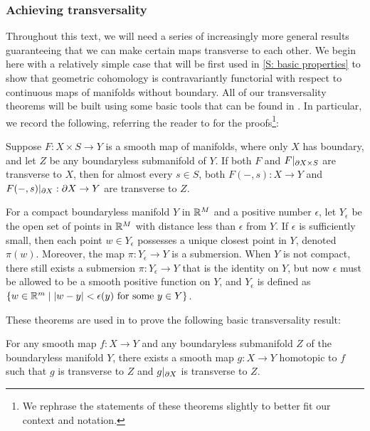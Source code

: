 \subsubsection{Achieving transversality}


Throughout this text, we will need a series of increasingly more general results guaranteeing that we can make certain maps transverse to each other.  We begin here with a relatively simple case that will be first used in  \cref{S: basic properties} to show that geometric cohomology is contravariantly functorial with respect to continuous maps of manifolds without boundary.
All of our transversality theorems  will be built using some basic tools that can be found in \cite[Section 2.3]{GuPo74}. In particular, we record the following, referring the reader to \cite[Section 2.3]{GuPo74} for the proofs\footnote{We rephrase the statements of these theorems slightly to better fit our context and notation.}:

\begin{theorem}
Suppose $F: X\times S\to Y$ is a smooth map of manifolds, where only $X$ has boundary, and let $Z$ be any boundaryless submanifold of $Y$. If both $F$ and $F|_{\partial X\times S}$ are transverse to $X$, then for almost every $s\in S$, both $F(-,s):X\to Y$ and $F(-,s)|_{\partial X}:\partial X\to Y$ are transverse to $Z$.
\end{theorem}

\begin{theorem}
For a compact boundaryless manifold $Y$ in $\mathbb{R}^M$ and a positive number $\epsilon$, let $Y_\epsilon$ be the open set of points in $\mathbb{R}^M$ with distance less than $\epsilon$ from $Y$. If $\epsilon$ is sufficiently small, then each point $w\in Y_\epsilon$ possesses a unique closest point in $Y$, denoted $\pi(w)$. Moreover, the map $\pi:Y_\epsilon\to Y$ is a submersion. When $Y$ is not compact, there still exists a submersion $\pi:Y_\epsilon\to Y$ that is the identity on $Y$, but now $\epsilon$ must be allowed to be a smooth positive function on $Y$, and $Y_\epsilon$ is defined as $\{w\in \mathbb{R}^m \mid |w-y|<\epsilon(y) \text{ for some $y\in Y$}\}$.
\end{theorem}

These theorems are used in \cite{GuPo74} to prove the following basic transversality result:

\begin{theorem}
For any smooth map $f:X\to Y$ and any boundaryless submanifold $Z$ of the boundaryless manifold $Y$, there exists a smooth map $g:X\to Y$ homotopic to $f$ such that $g$ is transverse to $Z$ and $g|_{\partial X}$ is transverse to $Z$.
\end{theorem}

